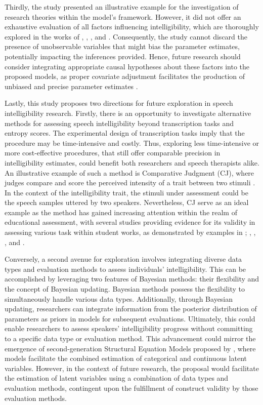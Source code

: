 \documentclass[
  authoryear,
  preprint,
  1p]{elsarticle}
\begin{document}
Thirdly, the study presented an illustrative example for the
investigation of research theories within the model's framework.
However, it did not offer an exhaustive evaluation of all factors
influencing intelligibility, which are thoroughly explored in the works
of \citet{Niparko_et_al_2010}, \citet{Boons_et_al_2012},
\citet{Gillis_2018}, and \citet{Fagan_et_al_2020}. Consequently, the
study cannot discard the presence of unobservable variables that might
bias the parameter estimates, potentially impacting the inferences
provided. Hence, future research should consider integrating appropriate
causal hypotheses about these factors into the proposed models, as
proper covariate adjustment facilitates the production of unbiased and
precise parameter estimates
\citep{Cinelli_et_al_2021, Deffner_et_al_2022}.

Lastly, this study proposes two directions for future exploration in
speech intelligibility research. Firstly, there is an opportunity to
investigate alternative methods for assessing speech intelligibility
beyond transcription tasks and entropy scores. The experimental design
of transcription tasks imply that the procedure may be time-intensive
and costly. Thus, exploring less time-intensive or more cost-effective
procedures, that still offer comparable precision in intelligibility
estimates, could benefit both researchers and speech therapists alike.
An illustrative example of such a method is Comparative Judgment (CJ),
where judges compare and score the perceived intensity of a trait
between two stimuli \citep{Thurstone_1927}. In the context of the
intelligibility trait, the stimuli under assessment could be the speech
samples uttered by two speakers. Nevertheless, CJ serve as an ideal
example as the method has gained increasing attention within the realm
of educational assessment, with several studies providing evidence for
its validity in assessing various task within student works, as
demonstrated by examples in \citet{Pollitt_2012a};
\citet{Pollitt_2012b}, \citet{Lesterhuis_2018}, \citet{vanDaal_2020},
and \citet{Verhavert_et_al_2019}.

Conversely, a second avenue for exploration involves integrating diverse
data types and evaluation methods to assess individuals'
intelligibility. This can be accomplished by leveraging two features of
Bayesian methods: their flexibility and the concept of Bayesian
updating. Bayesian methods possess the flexibility to simultaneously
handle various data types. Additionally, through Bayesian updating,
researchers can integrate information from the posterior distribution of
parameters as priors in models for subsequent evaluations. Ultimately,
this could enable researchers to assess speakers' intelligibility
progress without committing to a specific data type or evaluation
method. This advancement could mirror the emergence of second-generation
Structural Equation Models proposed by \citet{Muthen_2001}, where models
facilitate the combined estimation of categorical and continuous latent
variables. However, in the context of future research, the proposal
would facilitate the estimation of latent variables using a combination
of data types and evaluation methods, contingent upon the fulfillment of
construct validity by those evaluation methods.
\end{document}
